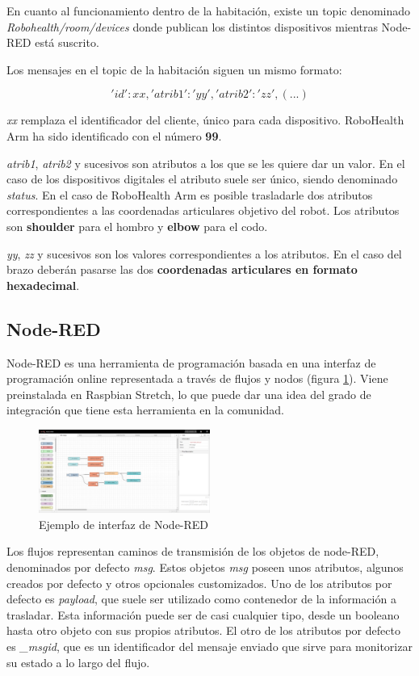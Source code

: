 En cuanto al funcionamiento dentro de la habitación, existe un topic denominado \textit{Robohealth/room/devices} donde publican los distintos dispositivos mientras Node-RED está suscrito.

Los mensajes en el topic de la habitación siguen un mismo formato:

$${'id':xx,'atrib1':'yy','atrib2':'zz',(...)}$$

\textit{xx} remplaza el identificador del cliente, único para cada dispositivo. RoboHealth Arm ha sido identificado con el número \textbf{99}.

\textit{atrib1}, \textit{atrib2} y sucesivos son atributos a los que se les quiere dar un valor. En el caso de los dispositivos digitales el atributo suele ser único, siendo denominado \textit{status}. En el caso de RoboHealth Arm es posible trasladarle dos atributos correspondientes a las coordenadas articulares objetivo del robot. Los atributos son \textbf{shoulder} para el hombro y \textbf{elbow} para el codo.

\textit{yy}, \textit{zz} y sucesivos son los valores correspondientes a los atributos. En el caso del brazo deberán pasarse las dos \textbf{coordenadas articulares en formato hexadecimal}.

\subsection{Node-RED}

Node-RED es una herramienta de programación basada en una interfaz de programación online representada a través de flujos y nodos (figura \ref{fig:nodeinterfaz}). Viene preinstalada en Raspbian Stretch, lo que puede dar una idea del grado de integración que tiene esta herramienta en la comunidad.

\begin{figure}[tb]
\centering
\includegraphics[width=0.5\textwidth]{figuras/InterfazNodeRed.png}
\caption{Ejemplo de interfaz de Node-RED}
\label{fig:nodeinterfaz}
\end{figure}

Los flujos representan caminos de transmisión de los objetos de node-RED, denominados por defecto \textit{msg}. Estos objetos \textit{msg} poseen unos atributos, algunos creados por defecto y otros opcionales customizados. Uno de los atributos por defecto es \textit{payload}, que suele ser utilizado como contenedor de la información a trasladar. Esta información puede ser de casi cualquier tipo, desde un booleano hasta otro objeto con sus propios atributos. El otro de los atributos por defecto es \textit{\_msgid}, que es un identificador del mensaje enviado que sirve para monitorizar su estado a lo largo del flujo.

